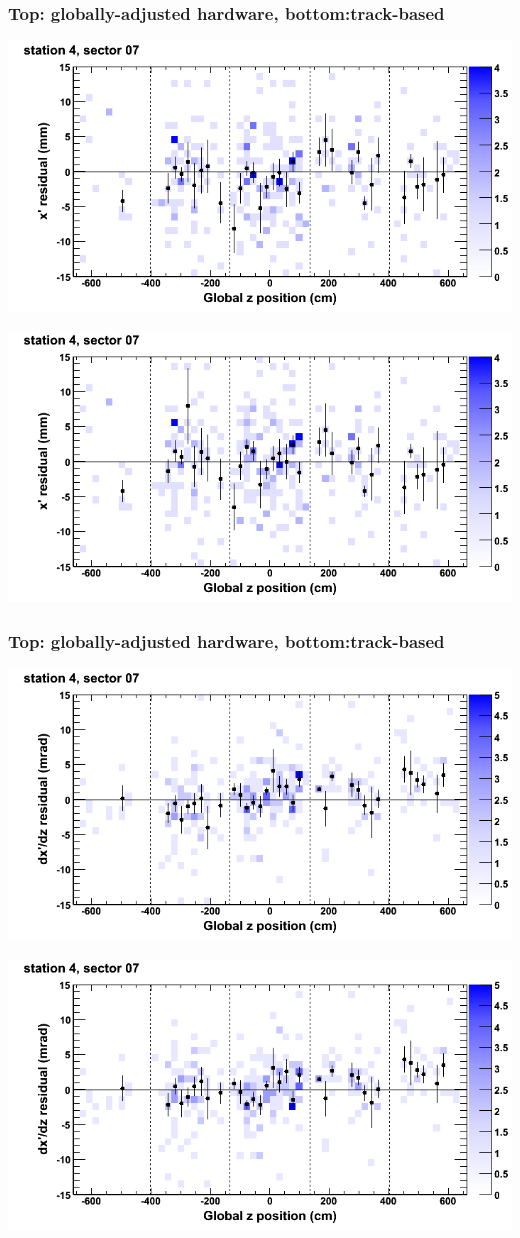\documentclass[compress]{beamer}
\begin{document}
\begin{frame}
\frametitle{Top: globally-adjusted hardware, bottom:track-based}
\includegraphics[width=0.7\linewidth]{NOV4_mapplots_HW/DTvsz_st4sec07_x.png}

\includegraphics[width=0.7\linewidth]{NOV4_mapplots/DTvsz_st4sec07_x.png}
\end{frame}

\begin{frame}
\frametitle{Top: globally-adjusted hardware, bottom:track-based}
\includegraphics[width=0.7\linewidth]{NOV4_mapplots_HW/DTvsz_st4sec07_dxdz.png}

\includegraphics[width=0.7\linewidth]{NOV4_mapplots/DTvsz_st4sec07_dxdz.png}
\end{frame}
\end{document}
